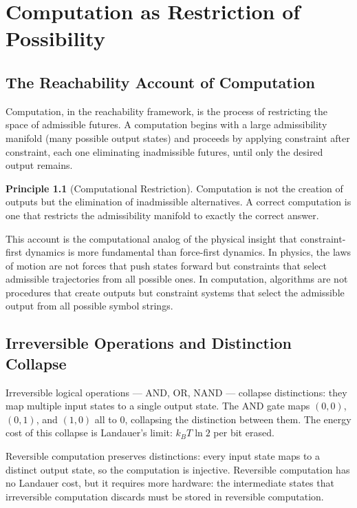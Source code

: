 \documentclass[12pt,a4paper]{book}
\theoremstyle{remark}
\theoremstyle{definition}
\newtheorem{principle}{Principle}[chapter]
\begin{document}
\chapter{Computation as Restriction of Possibility}

\section{The Reachability Account of Computation}

Computation, in the reachability framework, is the process of restricting
the space of admissible futures. A computation begins with a large
admissibility manifold (many possible output states) and proceeds by
applying constraint after constraint, each one eliminating inadmissible
futures, until only the desired output remains.

\begin{principle}[Computational Restriction]
Computation is not the creation of outputs but the elimination of
inadmissible alternatives. A correct computation is one that restricts
the admissibility manifold to exactly the correct answer.
\end{principle}

This account is the computational analog of the physical insight that
constraint-first dynamics is more fundamental than force-first dynamics.
In physics, the laws of motion are not forces that push states forward
but constraints that select admissible trajectories from all possible
ones. In computation, algorithms are not procedures that create outputs
but constraint systems that select the admissible output from all possible
symbol strings.

\section{Irreversible Operations and Distinction Collapse}

Irreversible logical operations --- AND, OR, NAND --- collapse distinctions:
they map multiple input states to a single output state. The AND gate maps
$(0,0)$, $(0,1)$, and $(1,0)$ all to $0$, collapsing the distinction
between them. The energy cost of this collapse is Landauer's limit:
$k_BT\ln 2$ per bit erased.

Reversible computation preserves distinctions: every input state maps to
a distinct output state, so the computation is injective. Reversible
computation has no Landauer cost, but it requires more hardware: the
intermediate states that irreversible computation discards must be stored
in reversible computation.
\end{document}
